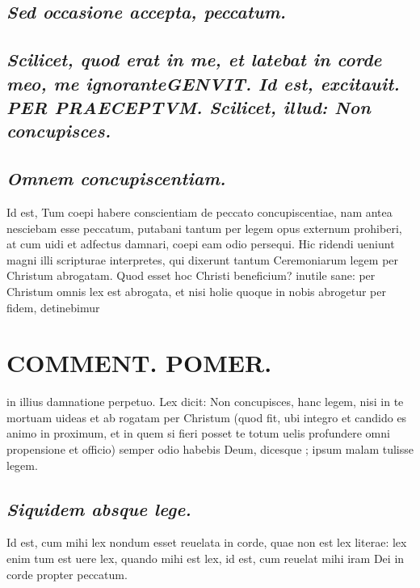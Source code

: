 \documentclass{article}
\begin{document}
\begin{pages}
\subsection*{\textit{Sed occasione accepta, peccatum. }}
{}
\subsection*{\textit{Scilicet, quod erat in me, et latebat in corde meo, me ignoranteGENVIT. Id est, excitauit.  PER PRAECEPTVM. Scilicet, illud: Non concupisces.  }}
{}
\subsection*{\textit{Omnem concupiscentiam. }}\pstart Id est, Tum coepi habere conscientiam de peccato concupiscentiae, nam antea nesciebam esse peccatum, putabani tantum per legem opus externum prohiberi, at cum uidi et adfectus damnari, coepi eam odio persequi. Hic ridendi ueniunt magni illi scripturae interpretes, qui dixerunt tantum Ceremoniarum legem per Christum abrogatam.  Quod esset hoc Christi beneficium? inutile sane: per Christum omnis lex est abrogata, et nisi holie quoque in nobis abrogetur per fidem, detinebimur  \pend
\section*{COMMENT. POMER.  }\pstart in illius damnatione perpetuo. Lex dicit: Non concupisces, hanc legem, nisi in te mortuam uideas et ab rogatam per Christum (quod fit, ubi integro et candido es animo in proximum, et in quem si fieri posset te totum uelis profundere omni propensione et officio) semper odio habebis Deum, dicesque ; ipsum malam tulisse legem.   \pend
{}
{}
\subsection*{\textit{Siquidem absque lege. }}\pstart Id est, cum mihi lex nondum esset reuelata in corde, quae non est lex literae: lex enim tum est uere lex, quando mihi est lex, id est, cum reuelat mihi iram Dei in corde propter peccatum.   \pend
{}
{}

\end{pages}
\end{document}

